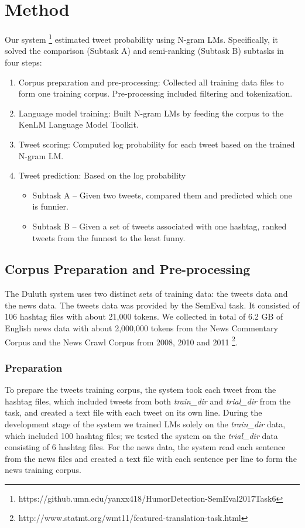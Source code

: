 \documentclass[11pt,a4paper]{article}
\begin{document}
\section{Method}
Our system \footnote{https://github.umn.edu/yanxx418/HumorDetection-SemEval2017Task6} estimated tweet probability using N-gram LMs. Specifically, it solved the comparison (Subtask A) and semi-ranking (Subtask B) subtasks in four steps:
\begin{enumerate}
\item Corpus preparation and pre-processing: Collected all training data files to form one training corpus. Pre-processing included filtering and tokenization.
\item Language model training: Built N-gram LMs by feeding the corpus to the KenLM Language Model Toolkit. 
\item Tweet scoring: Computed log probability for each tweet based on the trained N-gram LM.
\item Tweet prediction: Based on the log probability
\begin{itemize}
\item Subtask A -- Given two tweets, compared them and predicted which one is funnier. 
\item Subtask B -- Given a set of tweets associated with one hashtag, ranked tweets from the funnest to the least funny.
\end{itemize}
\end{enumerate}

\subsection{Corpus Preparation and Pre-processing}
The Duluth system uses two distinct sets of training data: the tweets data and the news data. The tweets data was provided by the SemEval task. It consisted of 106 hashtag files with about 21,000 tokens. We collected in total of 6.2 GB of English news data with about 2,000,000 tokens from the News Commentary Corpus and the News Crawl Corpus from 2008, 2010 and 2011 \footnote{http://www.statmt.org/wmt11/featured-translation-task.html}.   
\subsubsection{Preparation}
To prepare the tweets training corpus, the system took each tweet from the hashtag files, which included tweets from both \textit{train\_dir} and \textit{trial\_dir} from the task, and created a text file with each tweet on its own line. During the development stage of the system we trained LMs solely on the \textit{train\_dir} data, which included 100 hashtag files; we tested the system on the \textit{trial\_dir} data consisting of 6 hashtag files. For the news data, the system read each sentence from the news files and created a text file with each sentence per line to form the news training corpus. 
\end{document}
